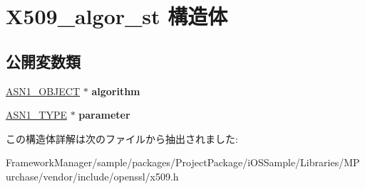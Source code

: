 \hypertarget{struct_x509__algor__st}{}\section{X509\+\_\+algor\+\_\+st 構造体}
\label{struct_x509__algor__st}
\subsection*{公開変数類}
\begin{DoxyCompactItemize}
\item 
\hypertarget{struct_x509__algor__st_a79eaee9147e50e87d311ccd20f781960}{}\hyperlink{structasn1__object__st}{A\+S\+N1\+\_\+\+O\+B\+J\+E\+C\+T} $\ast$ {\bfseries algorithm}\label{struct_x509__algor__st_a79eaee9147e50e87d311ccd20f781960}

\item 
\hypertarget{struct_x509__algor__st_a0c0f294d859665c5b1e6d86c695ac4e1}{}\hyperlink{structasn1__type__st}{A\+S\+N1\+\_\+\+T\+Y\+P\+E} $\ast$ {\bfseries parameter}\label{struct_x509__algor__st_a0c0f294d859665c5b1e6d86c695ac4e1}

\end{DoxyCompactItemize}


この構造体詳解は次のファイルから抽出されました\+:\begin{DoxyCompactItemize}
\item 
Framework\+Manager/sample/packages/\+Project\+Package/i\+O\+S\+Sample/\+Libraries/\+M\+Purchase/vendor/include/openssl/x509.\+h\end{DoxyCompactItemize}
